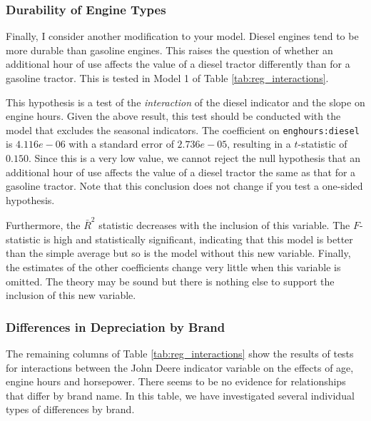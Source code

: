 \subsubsection{Durability of Engine Types}

Finally, I consider another modification to your model. 
Diesel engines tend to be more durable than gasoline engines. 
This raises the question of whether an additional hour of use affects the value of a diesel tractor differently than for a gasoline tractor. 
This is tested in Model 1 of Table \ref{tab:reg_interactions}. 

	This hypothesis is a test of the \emph{interaction} of the diesel indicator and the slope on engine hours. 
      Given the above result, this test should be conducted with the model that excludes the seasonal indicators. 
The coefficient on \texttt{enghours:diesel} is $4.116e-06$ with a standard error of $2.736e-05$, resulting in a $t$-statistic of $0.150$. 
Since this is a very low value, we cannot reject the null hypothesis that an additional hour of use affects the value of a diesel tractor the same as that for a gasoline tractor. 
Note that this conclusion does not change if you test a one-sided hypothesis.  

Furthermore, the $\bar{R}^2$ statistic decreases with the inclusion of this variable. 
The $F$-statistic is high and statistically significant, indicating that this model is better than the simple average but so is the model without this new variable. 
Finally, the estimates of the other coefficients change very little when this variable is omitted. 
The theory may be sound but there is nothing else to support the inclusion of this new variable. 

\pagebreak
\subsubsection{Differences in Depreciation by Brand}

The remaining columns of Table \ref{tab:reg_interactions}
show the results of tests for interactions
between the John Deere indicator variable
on the effects of age, engine hours and horsepower. 
There seems to be no evidence for relationships that differ by
brand name. 
In this table, we have investigated several 
individual types of differences by brand. 



